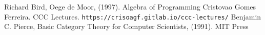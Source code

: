 \begin{thebibliography}{99}
Richard Bird, Oege de Moor, (1997). Algebra of Programming
Cristovao Gomes Ferreira. CCC Lectures.
\newline\texttt{https://crisoagf.gitlab.io/ccc-lectures/}
Benjamin C. Pierce, Basic Category Theory for Computer Scientists, (1991). 
MIT Press
\end{thebibliography}
